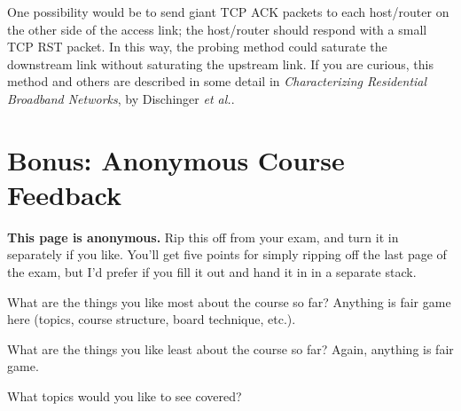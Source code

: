 \documentclass[11pt]{article}
\newcommand{\sols}[1]{#1}
\newcommand{\sols}[1]{}
\begin{document}
\sols{ One possibility would be to send giant TCP ACK packets to each
  host/router on the other side of the access link; the host/router
  should respond with a small TCP RST packet.  In this way, the probing
  method could saturate the downstream link without saturating the
  upstream link.  If you are curious, this method and others are
  described in some detail in {\em Characterizing Residential Broadband
    Networks}, by Dischinger {\em et al.}.  }

\newpage
\section{Bonus: Anonymous Course Feedback}

{\bf This page is anonymous.}  Rip this off from your exam, and turn it
in separately if you like.  You'll get five points for simply ripping
off the last page of the exam, but I'd prefer if you fill it out and
hand it in in a separate stack.
\vspace{.5in}

What are the things you like most about the course so far?  Anything is
fair game here (topics, course structure, board technique, etc.).
\vspace{1.5in}


What are the things you like least about the course so far?  Again,
anything is fair game.
\vspace{1in}


What topics would you like to see covered?
\vspace{1in}




\label{lastpage}
\end{document}
